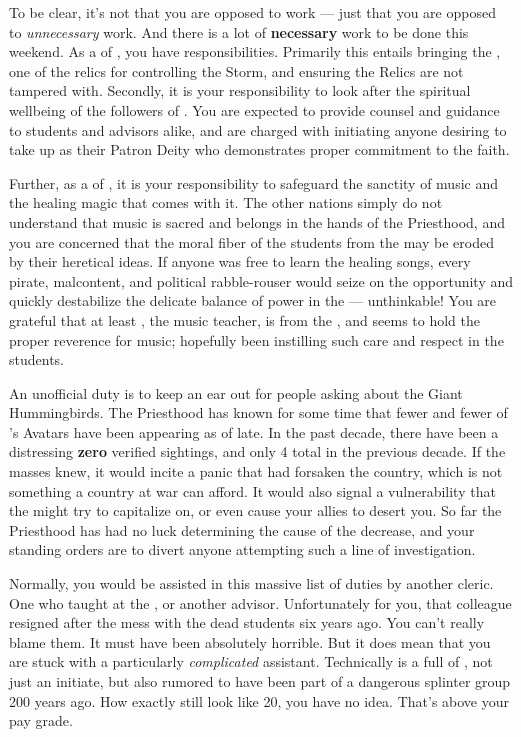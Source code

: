 \documentclass[char]{GL2020}
\begin{document}
To be clear, it's not that you are opposed to work — just that you are opposed to \emph{unnecessary} work. And there is a lot of \textbf{necessary} work to be done this weekend. As a \cHedonist{\cleric} of \cFarmGod{}, you have responsibilities. Primarily this entails bringing the \iPitcher{}, one of the \pFarm{} relics for controlling the Storm, and ensuring the Relics are not tampered with. Secondly, it is your responsibility to look after the spiritual wellbeing of the followers of \cFarmGod{}. You are expected to provide counsel and guidance to students and advisors alike, and are charged with initiating anyone desiring to take up \cFarmGod{} as their Patron Deity who demonstrates proper commitment to the faith. 

Further, as a \cHedonist{\cleric} of \cFarmGod{}, it is your responsibility to safeguard the sanctity of music and the healing magic that comes with it. The other nations simply do not understand that music is sacred and belongs in the hands of the Priesthood, and you are concerned that the moral fiber of the students from the \pFarm{} may be eroded by their heretical ideas. If anyone was free to learn the healing songs, every pirate, malcontent, and political rabble-rouser would seize on the opportunity and quickly destabilize the delicate balance of power in the \pFarm{} — unthinkable! You are grateful that at least \cMusic{\full}, the music teacher, is from the \pFarm{}, and seems to hold the proper reverence for music; hopefully \cMusic{\theyhave} been instilling such care and respect in the students.

An unofficial duty is to keep an ear out for people asking about the Giant Hummingbirds. The Priesthood has known for some time that fewer and fewer of \cFarmGod{}'s Avatars have been appearing as of late. In the past decade, there have been a distressing \textbf{zero} verified sightings, and only 4 total in the previous decade. If the masses knew, it would incite a panic that \cFarmGod{} had forsaken the country, which is not something a country at war can afford. It would also signal a vulnerability that the \pShippies{} might try to capitalize on, or even cause your \pTech{} allies to desert you. So far the Priesthood has had no luck determining the cause of the decrease, and your standing orders are to divert anyone attempting such a line of investigation.

Normally, you would be assisted in this massive list of duties by another cleric. One who taught at the \pSchool{}, or another advisor. Unfortunately for you, that colleague resigned after the mess with the dead students six years ago. You can’t really blame them. It must have been absolutely horrible. But it does mean that you are stuck with a particularly \emph{complicated} assistant. Technically \cDisney{} is a full \cDisney{\cleric} of \cFarmGod{}, not just an initiate, but \cDisney{\theyare} also rumored to have been part of a dangerous splinter group 200 years ago. How exactly \cDisney{\they} still look\cDisney{\verbs} like \cDisney{\theyare} 20, you have no idea. That’s above your pay grade.
\end{document}
